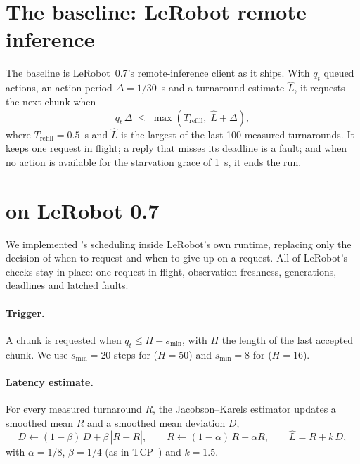 \section{The baseline: LeRobot remote inference}\label{sec:baseline}

The baseline is LeRobot~0.7's remote-inference client as it ships. With $q_t$ queued actions, an action period
$\Delta = 1/30$~s and a turnaround estimate $\hat L$, it requests the next chunk when
\begin{equation}
  q_t\,\Delta \;\le\; \max\!\left(T_{\mathrm{refill}},\; \hat L + \Delta\right),
\end{equation}
where $T_{\mathrm{refill}}=0.5$~s and $\hat L$ is the largest of the last 100 measured turnarounds. It keeps one request
in flight; a reply that misses its deadline is a fault; and when no action is available for the starvation grace of
1~s, it ends the run.

\section{\drtc{} on LeRobot 0.7}\label{sec:drtc}

We implemented \drtc's scheduling inside LeRobot's own runtime, replacing only the decision of when to request and
when to give up on a request. All of LeRobot's checks stay in place: one request in flight, observation freshness,
generations, deadlines and latched faults.

\paragraph{Trigger.} A chunk is requested when $q_t \le H - s_{\min}$, with $H$ the length of the last accepted chunk.
We use $s_{\min}=20$ steps for \smolvla{} ($H=50$) and $s_{\min}=8$ for \groot{} ($H=16$).

\paragraph{Latency estimate.} For every measured turnaround $R$, the Jacobson--Karels estimator updates a smoothed mean
$\bar R$ and a smoothed mean deviation $D$,
\begin{equation}
  D \leftarrow (1-\beta)\,D + \beta\,|R-\bar R|, \qquad \bar R \leftarrow (1-\alpha)\,\bar R + \alpha R, \qquad
  \hat L = \bar R + k\,D,
\end{equation}
with $\alpha=1/8$, $\beta=1/4$ (as in TCP~\cite{rfc6298}) and $k=1.5$.

